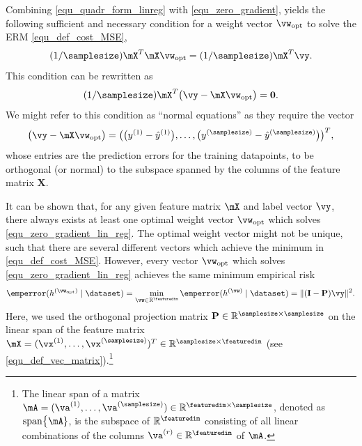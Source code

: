 \documentclass[12pt]{report}
\begin{document}
Combining \eqref{equ_quadr_form_linreg} with \eqref{equ_zero_gradient}, 
yields the following sufficient and necessary condition for a weight vector 
$\vw_{\rm opt}$ to solve the ERM \eqref{equ_def_cost_MSE},
\begin{equation}
\label{equ_zero_gradient_lin_reg}
(1/\samplesize) \mX^{T} \mX \vw_{\rm opt} = (1/\samplesize) \mX^{T} \vy.  
\end{equation} 
This condition can be rewritten as 
\begin{equation}
\label{equ_zero_gradient_lin_reg_normal_condition}
(1/\samplesize) \mX^{T} \big( \vy - \mX \vw_{\rm opt} \big) = \mathbf{0}.  
\end{equation} 
We might refer to this condition as ``normal equations'' as they 
require the vector $$\big( \vy - \mX \vw_{\rm opt} \big) = \big(\big(y^{(1)}-\hat{y}^{(1)}\big),\ldots,\big(y^{(\samplesize)}-\hat{y}^{(\samplesize)}\big)  \big)^{T},$$
whose entries are the prediction errors for the training datapoints, to 
be orthogonal (or normal) to the subspace spanned by the columns 
of the feature matrix $\mathbf{X}$. 


It can be shown that, for any given feature matrix $\mX$ and label vector $\vy$, there always 
exists at least one optimal weight vector $\vw_{\rm opt}$ which solves \eqref{equ_zero_gradient_lin_reg}. 
The optimal weight vector might not be unique, such that there are several different vectors 
which achieve the minimum in \eqref{equ_def_cost_MSE}. However, 
every vector $\vw_{\rm opt}$ which solves \eqref{equ_zero_gradient_lin_reg} 
achieves the same minimum empirical risk 
\begin{equation}
\label{equ_emp_risk_lin_proje}
\emperror(h^{(\vw_{\rm opt})} \mid \dataset) = \min_{\vw \in \mathbb{R}^{\featuredim}} \emperror(h^{(\vw)} \mid \dataset) = \|  (\mathbf{I}- \mathbf{P}) \vy \|^{2}.
\end{equation} 
Here, we used the orthogonal projection matrix $\mathbf{P} \in \mathbb{R}^{\samplesize \times \samplesize}$ 
on the linear span of the feature matrix $\mX = (\vx^{(1)},\ldots,\vx^{(\samplesize)})^{T} \in \mathbb{R}^{\samplesize \times \featuredim}$ (see \eqref{equ_def_vec_matrix}).\footnote{The linear span of a matrix $\mA=(\va^{(1)},\ldots,\va^{(\samplesize)}) \in \mathbb{R}^{\featuredim \times \samplesize}$, denoted as ${\rm span } \big\{\mA\}$, is the subspace 
	of $\mathbb{R}^{\featuredim}$ consisting of all linear combinations 
of the columns $\va^{(r)} \in \mathbb{R}^{\featuredim}$ of $\mA$.} 
\end{document}
